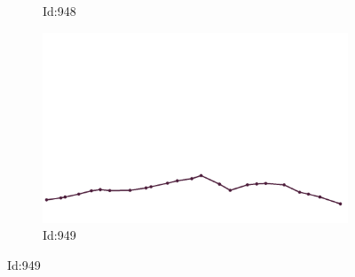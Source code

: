 \documentclass[12pt,twoside]{report}
\begin{document}
\begin{figure}
\begin{subfigure}[b]{0.20\textwidth}
\caption{Id:948}
\end{subfigure}
\begin{subfigure}[b]{0.20\textwidth}
\centering
\includegraphics[width=\textwidth]{../trajectories/949.png}
\caption{Id:949}
\end{subfigure}
\end{figure}
\end{document}
